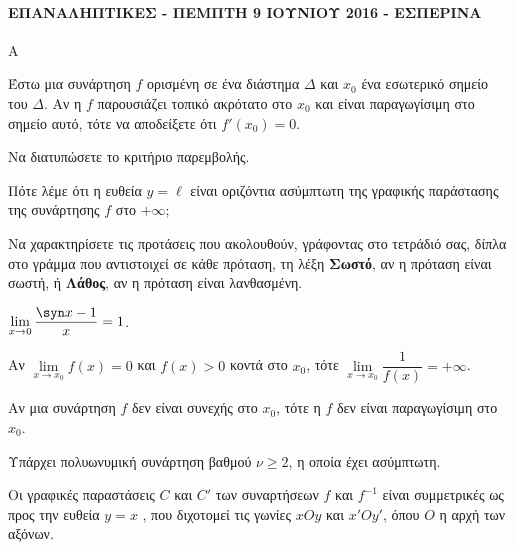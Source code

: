 \paragraph{ΕΠΑΝΑΛΗΠΤΙΚΕΣ - ΠΕΜΠΤΗ 9 ΙΟΥΝΙΟΥ 2016 - ΕΣΠΕΡΙΝΑ}
\begin{thema}{Α}
\begin{erwthma}
    \item Έστω μια συνάρτηση $f$ ορισμένη σε ένα διάστημα $\Delta$ και $x_0$ ένα εσωτερικό σημείο του $\Delta$. Αν η $f$ παρουσιάζει τοπικό ακρότατο στο $x_0$ και είναι παραγωγίσιμη στο σημείο αυτό, τότε να αποδείξετε ότι $f'(x_0) = 0$. 
    \item Να διατυπώσετε το κριτήριο παρεμβολής. 
    \item Πότε λέμε ότι η ευθεία $y = \ell$ είναι οριζόντια ασύμπτωτη της γραφικής παράστασης της συνάρτησης $f$ στο $+\infty$; 
    \item Να χαρακτηρίσετε τις προτάσεις που ακολουθούν, γράφοντας στο τετράδιό σας, δίπλα στο γράμμα που αντιστοιχεί σε κάθε πρόταση, τη λέξη \textbf{Σωστό}, αν η πρόταση είναι σωστή, ή \textbf{Λάθος}, αν η πρόταση είναι λανθασμένη.
    \begin{alist}
        \item $\displaystyle\lim_{x \to 0} \dfrac{\syn x - 1}{x} = 1$.
        \item Αν $\lim\limits_{x \to x_0} f(x)=0$ και $f(x)>0$ κοντά στο $x_0$, τότε $\lim\limits_{x\to x_0}{\dfrac{1}{f(x)}}=+\infty$.
        \item Αν μια συνάρτηση $f$ δεν είναι συνεχής στο $x_0$, τότε η $f$ δεν είναι παραγωγίσιμη στο $x_0$.
        \item Υπάρχει πολυωνυμική συνάρτηση βαθμού $\nu \geq 2$, η οποία έχει ασύμπτωτη.
        \item Οι γραφικές παραστάσεις $C$ και $C'$ των συναρτήσεων $f$ και $f^{-1}$ είναι συμμετρικές ως προς την ευθεία $y=x$ , που διχοτομεί τις γωνίες $xOy$ και $x'Oy'$, όπου $O$ η αρχή των αξόνων.
    \end{alist} 
\end{erwthma}
\end{thema}
